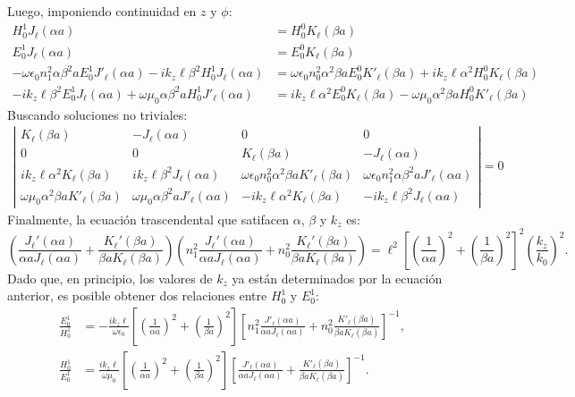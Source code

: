 Luego, imponiendo continuidad en $z$ y $\phi$:
\begin{align}
	H_0^{1} J_\ell(\alpha a) &= H_0^{0} K_\ell (\beta a)
	\label{eqn:cont1}
	\\
	E_0^{1} J_\ell(\alpha a) &= E_0^{0} K_\ell (\beta a)
	\label{eqn:cont2}
	 \\
	 -\omega \epsilon_0 n_1^2  \alpha\beta^2 a E_0^1 J'_\ell (\alpha a)-ik_z\ell \beta^2 H_0^1  J_\ell (\alpha a)
	 &= \omega \epsilon_0 n_0^2 \alpha^2 \beta a E_0^0 K'_\ell (\beta a)+ik_z\ell \alpha^2H_0^0  K_\ell (\beta a)
	 \label{eqn:cont3}
	 \\
	 -ik_z \ell \beta^2 E_0^1   J_\ell (\alpha a) + \omega \mu_0  \alpha \beta^2 a H_0^1  J'_\ell (\alpha a) &=
	 ik_z \ell \alpha^2 E_0^0   K_\ell (\beta a) -\omega \mu_0  \alpha^2 \beta a H_0^0  K'_\ell (\beta a)
	 \label{eqn:cont4}
\end{align}
Buscando soluciones no triviales:
\begin{align*}
	\left|\begin{matrix}
		K_\ell(\beta a) & -J_\ell(\alpha a) & 0 & 0
		\\
		0 & 0 & K_\ell(\beta a) & -J_\ell(\alpha a)
		\\
		ik_z\ell \alpha^2 K_\ell (\beta a) & ik_z\ell\beta^2 J_\ell (\alpha a) & \omega \epsilon_0 n_0^2  \alpha^2 \beta a K'_\ell (\beta a) & \omega \epsilon_0 n_1^2  \alpha \beta^2 a J'_\ell (\alpha a)
		\\
		\omega \mu_0  \alpha^2 \beta a   K'_\ell (\beta a) &  \omega \mu_0  \alpha \beta^2 a J'_\ell (\alpha a) & -ik_z \ell \alpha^2 K_\ell (\beta a) &  -ik_z \ell \beta^2  J_\ell (\alpha a)
	\end{matrix}\right|
	=
0
\end{align*}
Finalmente, la ecuación trascendental que satifacen $\alpha$, $\beta$ y $k_z$ es:
\begin{equation}
	\left( \frac{J_\ell'(\alpha a)}{\alpha a J_\ell(\alpha a)} + \frac{K_\ell'(\beta a)}{\beta a K_\ell(\beta a)} \right)\left( n_1^2\frac{J_\ell'(\alpha a)}{\alpha a J_\ell(\alpha a)} + n_0^2\frac{K_\ell'(\beta a)}{\beta a K_\ell(\beta a)} \right) = \ell^2 \left[ \left(\frac{1}{\alpha a}\right)^2 + \left(\frac{1}{\beta a}\right)^2 \right]^2 \left( \frac{k_z}{k_0} \right)^2 . \label{eqn:fiber_trascendental}
\end{equation}
Dado que, en principio, los valores de $k_z$ ya están determinados por la ecuación anterior, es posible obtener dos relaciones entre $H_0^1$ y $E_0^1$:
\begin{align}
\frac{E_0^1}{H_0^1} &=  -\frac{i k_z \ell}{\omega\epsilon_0}\left[ \left(\frac{1}{\alpha a}\right)^2 + \left(\frac{1}{\beta a}\right)^2 \right]  \left[ n_1^2 \frac{J'_\ell(\alpha a)}{\alpha a J_\ell(\alpha a)} + n_0^2 \frac{K'_\ell(\beta a)}{\beta a K_\ell(\beta a)} \right]^{-1} \label{eqn:fiber_polarization_E},
\\
\frac{H_0^1}{E_0^1} &=  \frac{i k_z \ell}{ \omega\mu_0}\left[ \left(\frac{1}{\alpha a}\right)^2 + \left(\frac{1}{\beta a}\right)^2 \right]  \left[ \frac{J'_\ell(\alpha a)}{\alpha a J_\ell(\alpha a)} + \frac{K'_\ell(\beta a)}{\beta a K_\ell(\beta a)} \right]^{-1} \label{eqn:fiber_polarization_H}.
\end{align}

